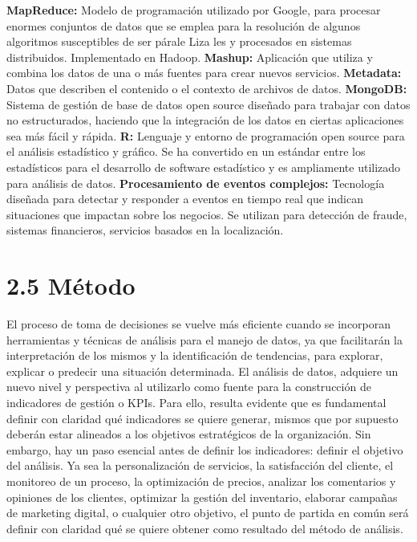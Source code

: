 \documentclass[
  letterpaper,
  DIV=11,
  numbers=noendperiod]{scrreprt}
\begin{document}
\textbf{MapReduce:} Modelo de programación utilizado por Google, para
procesar enormes conjuntos de datos que se emplea para la resolución de
algunos algoritmos susceptibles de ser párale Liza les y procesados en
sistemas distribuidos. Implementado en Hadoop. \textbf{Mashup:}
Aplicación que utiliza y combina los datos de una o más fuentes para
crear nuevos servicios. \textbf{Metadata:} Datos que describen el
contenido o el contexto de archivos de datos. \textbf{MongoDB:} Sistema
de gestión de base de datos open source diseñado para trabajar con datos
no estructurados, haciendo que la integración de los datos en ciertas
aplicaciones sea más fácil y rápida. \textbf{R:} Lenguaje y entorno de
programación open source para el análisis estadístico y gráfico. Se ha
convertido en un estándar entre los estadísticos para el desarrollo de
software estadístico y es ampliamente utilizado para análisis de datos.
\textbf{Procesamiento de eventos complejos:} Tecnología diseñada para
detectar y responder a eventos en tiempo real que indican situaciones
que impactan sobre los negocios. Se utilizan para detección de fraude,
sistemas financieros, servicios basados en la localización.

\hypertarget{muxe9todo-1}{%
\section{2.5 Método}\label{muxe9todo-1}}

El proceso de toma de decisiones se vuelve más eficiente cuando se
incorporan herramientas y técnicas de análisis para el manejo de datos,
ya que facilitarán la interpretación de los mismos y la identificación
de tendencias, para explorar, explicar o predecir una situación
determinada. El análisis de datos, adquiere un nuevo nivel y perspectiva
al utilizarlo como fuente para la construcción de indicadores de gestión
o KPIs. Para ello, resulta evidente que es fundamental definir con
claridad qué indicadores se quiere generar, mismos que por supuesto
deberán estar alineados a los objetivos estratégicos de la organización.
Sin embargo, hay un paso esencial antes de definir los indicadores:
definir el objetivo del análisis. Ya sea la personalización de
servicios, la satisfacción del cliente, el monitoreo de un proceso, la
optimización de precios, analizar los comentarios y opiniones de los
clientes, optimizar la gestión del inventario, elaborar campañas de
marketing digital, o cualquier otro objetivo, el punto de partida en
común será definir con claridad qué se quiere obtener como resultado del
método de análisis.
\end{document}
